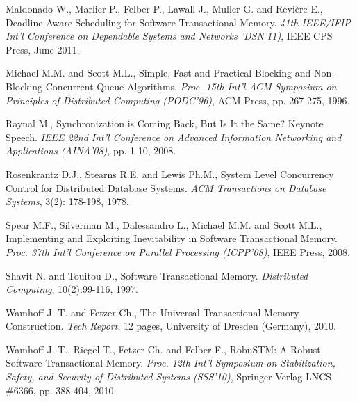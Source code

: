 \begin{thebibliography}{99}
{%
Maldonado W.,  Marlier P., Felber P.,  Lawall J., Muller G. and Revi\`ere E., 
Deadline-Aware Scheduling for Software Transactional Memory. 
{\it 41th  IEEE/IFIP Int'l  Conference on  Dependable  Systems and Networks
'DSN'11)}, IEEE CPS Press, June 2011. 




Michael M.M.  and Scott M.L., 
Simple, Fast and Practical Blocking and Non-Blocking Concurrent
Queue Algorithms.
{\it  Proc. 15th  Int'l  ACM Symposium on Principles of  Distributed 
Computing (PODC'96)},  ACM Press, pp. 267-275,  1996. 



Raynal  M.,
Synchronization is Coming Back, But Is It the Same?
Keynote Speech. {\it  IEEE 22nd Int'l Conference on Advanced 
Information  Networking and Applications (AINA'08)},  pp. 1-10, 2008. 


Rosenkrantz D.J.,  Stearns R.E. and Lewis Ph.M., 
System Level Concurrency Control for Distributed Database Systems.
{\it  ACM Transactions on  Database Systems},  3(2): 178-198, 1978.


Spear M.F., Silverman M., Dalessandro L., Michael M.M.  and Scott M.L., 
Implementing and Exploiting Inevitability in Software Transactional Memory.
{\it Proc. 37th Int'l Conference on Parallel Processing (ICPP'08)}, 
IEEE Press, 2008. 


Shavit N. and Touitou D., 
Software Transactional Memory. 
{\it Distributed  Computing}, 10(2):99-116, 1997. 

Wamhoff J.-T. and   Fetzer Ch., 
The Universal Transactional Memory Construction. 
{\it Tech Report}, 12 pages, University of Dresden (Germany), 2010. 
 

Wamhoff J.-T.,   Riegel T.,  Fetzer Ch. and  Felber F., 
RobuSTM: A Robust Software Transactional Memory.
{\it Proc. 12th Int'l Symposium on  Stabilization, Safety, and Security 
of Distributed Systems (SSS'10)}, 
Springer Verlag LNCS \#6366, pp.  388-404,  2010. 

}
\end{thebibliography}

